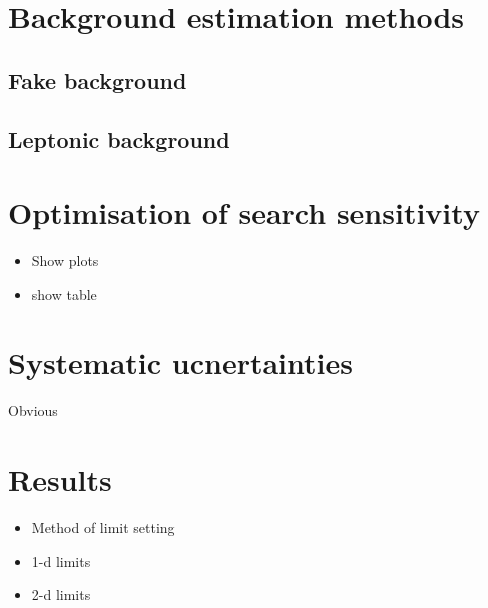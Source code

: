 \section{Background estimation methods}
\subsection{Fake background}
\subsection{Leptonic background}




\section{Optimisation of search sensitivity}
\begin{itemize}
\item Show plots
\item show table
\end{itemize}

\section{Systematic ucnertainties}
Obvious

\section{Results}
\begin{itemize}
\item Method of limit setting
\item 1-d limits
\item 2-d limits
\end{itemize}

